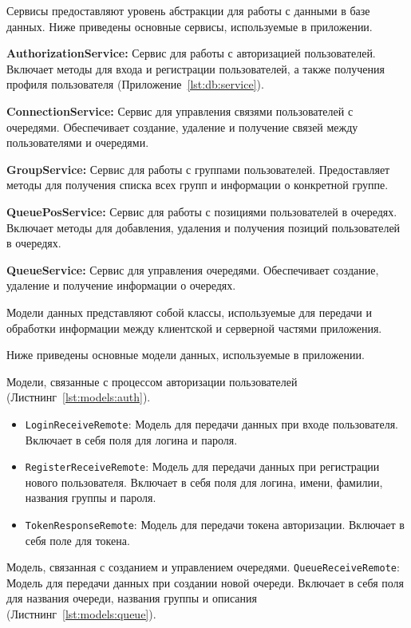 Сервисы предоставляют уровень абстракции для работы с данными в базе данных.
Ниже приведены основные сервисы, используемые в приложении.

\textbf{AuthorizationService:} Сервис для работы
с авторизацией пользователей. Включает методы для входа
и регистрации пользователей, а также получения профиля пользователя
(Приложение~\ref{lst:db:service}).

\textbf{ConnectionService:}
Сервис для управления связями пользователей с очередями.
Обеспечивает создание, удаление и получение связей между пользователями
и очередями.

\textbf{GroupService:}
Сервис для работы с группами пользователей.
Предоставляет методы для получения списка всех групп
и информации о конкретной группе.

\textbf{QueuePosService:}
Сервис для работы с позициями пользователей в очередях.
Включает методы для добавления, удаления
и получения позиций пользователей в очередях.

\textbf{QueueService:}
Сервис для управления очередями. Обеспечивает создание, удаление
и получение информации о очередях.



Модели данных представляют собой классы, используемые для передачи
и обработки информации между клиентской и серверной частями приложения.\par
Ниже приведены основные модели данных, используемые в приложении.

Модели, связанные с процессом авторизации пользователей
(Листнинг~\ref{lst:models:auth}).

\begin{itemize}
    \item \texttt{LoginReceiveRemote}: Модель для передачи данных
		при входе пользователя. Включает в себя поля для логина и пароля.
    \item \texttt{RegisterReceiveRemote}: Модель для передачи данных
		при регистрации нового пользователя.
		Включает в себя поля для логина, имени, фамилии,
		названия группы и пароля.
    \item \texttt{TokenResponseRemote}: Модель для передачи
		токена авторизации. Включает в себя поле для токена.
\end{itemize}

Модель, связанная с созданием и управлением очередями.
\texttt{QueueReceiveRemote}: Модель для передачи данных
при создании новой очереди. Включает в себя поля для названия очереди,
названия группы и описания
(Листнинг~\ref{lst:models:queue}).

